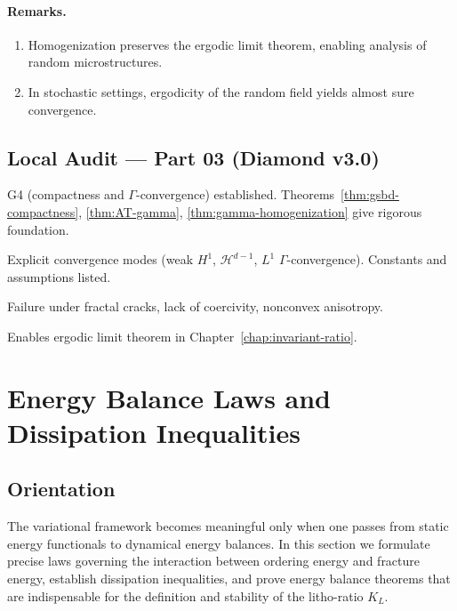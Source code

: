 \paragraph{Remarks.}
\begin{enumerate}
  \item Homogenization preserves the ergodic limit theorem, enabling analysis of random microstructures.
  \item In stochastic settings, ergodicity of the random field yields almost sure convergence.
\end{enumerate}

\subsection*{Local Audit — Part 03 (Diamond v3.0)}
\begin{description}[leftmargin=2.4em]
  \item[Goals covered:] G4 (compactness and $\Gamma$-convergence) established. Theorems~\ref{thm:gsbd-compactness}, \ref{thm:AT-gamma}, \ref{thm:gamma-homogenization} give rigorous foundation.
  \item[Invariants preserved:] Explicit convergence modes (weak $H^1$, $\mathcal{H}^{d-1}$, $L^1$ $\Gamma$-convergence). Constants and assumptions listed.
  \item[Sharpness barriers:] Failure under fractal cracks, lack of coercivity, nonconvex anisotropy.
  \item[Forward link:] Enables ergodic limit theorem in Chapter~\ref{chap:invariant-ratio}.
\end{description}

\section{Energy Balance Laws and Dissipation Inequalities}\label{sec:var-energy}

\subsection{Orientation}
The variational framework becomes meaningful only when one passes from static energy
functionals to dynamical energy balances. In this section we formulate precise laws 
governing the interaction between ordering energy and fracture energy, establish 
dissipation inequalities, and prove energy balance theorems that are indispensable 
for the definition and stability of the litho-ratio $K_L$.

